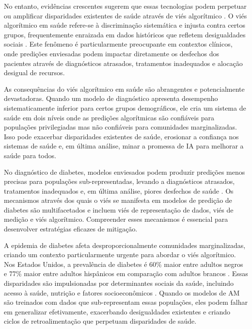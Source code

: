 No entanto, evidências crescentes sugerem que essas tecnologias podem 
perpetuar ou amplificar disparidades existentes de saúde através de viés 
algorítmico \cite{mehrabi2021}. O viés algorítmico em saúde refere-se à 
discriminação sistemática e injusta contra certos grupos, frequentemente 
enraizada em dados históricos que refletem desigualdades sociais 
\cite{barocas2019}. Este fenômeno é particularmente preocupante em contextos 
clínicos, onde predições enviesadas podem impactar diretamente os desfechos 
dos pacientes através de diagnósticos atrasados, tratamentos inadequados 
e alocação desigual de recursos.

As consequências do viés algorítmico em saúde são abrangentes e 
potencialmente devastadoras. Quando um modelo de diagnóstico apresenta 
desempenho sistematicamente inferior para certos grupos demográficos, ele 
cria um sistema de saúde em dois níveis onde as predições algorítmicas são 
confiáveis para populações privilegiadas mas não confiáveis para comunidades 
marginalizadas. Isso pode exacerbar disparidades existentes de saúde, 
erosionar a confiança nos sistemas de saúde e, em última análise, minar a 
promessa de IA para melhorar a saúde para todos.

No diagnóstico de diabetes, modelos enviesados podem produzir predições 
menos precisas para populações sub-representadas, levando a diagnósticos 
atrasados, tratamentos inadequados e, em última análise, piores desfechos 
de saúde \cite{obermeyer2019}. Os mecanismos através dos quais o viés se 
manifesta em modelos de predição de diabetes são multifacetados e incluem 
viés de representação de dados, viés de medição e viés algorítmico. 
Compreender esses mecanismos é essencial para desenvolver estratégias 
eficazes de mitigação.

A epidemia de diabetes afeta desproporcionalmente comunidades 
marginalizadas, criando um contexto particularmente urgente para abordar 
o viés algorítmico. Nos Estados Unidos, a prevalência de diabetes é 60\% 
maior entre adultos negros e 77\% maior entre adultos hispânicos em 
comparação com adultos brancos \cite{cdc2020}. Essas disparidades são 
impulsionadas por determinantes sociais da saúde, incluindo acesso à saúde, 
nutrição e fatores socioeconômicos \cite{hill2022}. Quando os modelos de 
AM são treinados com dados que sub-representam essas populações, eles 
podem falhar em generalizar efetivamente, exacerbando desigualdades 
existentes e criando ciclos de retroalimentação que perpetuam disparidades 
de saúde.

